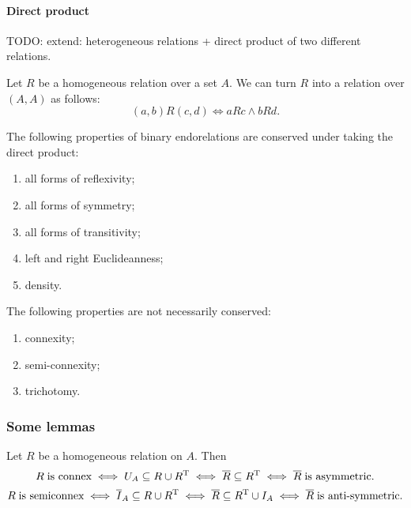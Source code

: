 \paragraph{Direct product}
TODO: extend: heterogeneous relations + direct product of two different relations.
\begin{definition}
Let $R$ be a homogeneous relation over a set $A$. We can turn $R$ into a relation over $(A, A)$ as follows:
\[ (a,b)R(c,d) \iff aRc \land bRd. \]
\end{definition}
\begin{lemma} \label{lemma:relationPropertiesDirectProduct}
The following properties of binary endorelations are conserved under taking the direct product:
\begin{enumerate}
\item all forms of reflexivity;
\item all forms of symmetry;
\item all forms of transitivity;
\item left and right Euclideanness;
\item density.
\end{enumerate}
The following properties are not necessarily conserved:
\begin{enumerate}
\item connexity;
\item semi-connexity;
\item trichotomy.
\end{enumerate}
\end{lemma}

\subsubsection{Some lemmas}
\begin{lemma}
Let $R$ be a homogeneous relation on $A$. Then
\[ R \;\text{is connex} \iff U_A \subseteq R\cup R^{\mathrm{T}} \iff \overline{R}\subseteq R^{\mathrm{T}} \iff \overline{R}\; \text{is asymmetric}. \]
\[ R\; \text{is semiconnex} \iff \overline{I}_A \subseteq R\cup R^{\mathrm{T}} \iff \overline{R}\subseteq R^{\mathrm{T}}\cup I_A \iff \overline{R}\; \text{is anti-symmetric}. \]
\end{lemma}

